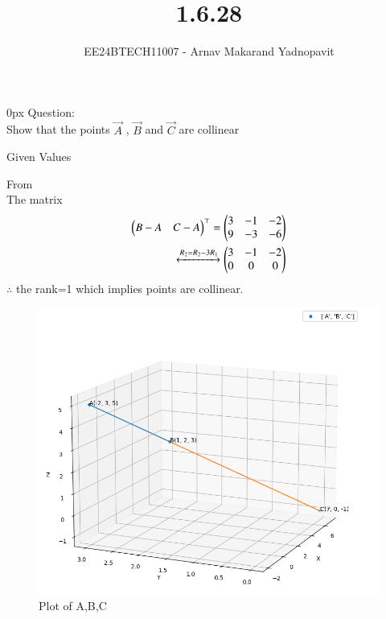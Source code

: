 \documentclass[journal]{IEEEtran}
\begin{document}

\title{1.6.28}
\author{EE24BTECH11007 - Arnav Makarand Yadnopavit}
{\let\newpage\relax\maketitle}
\renewcommand{\thefigure}{\theenumi}
\renewcommand{\thetable}{\theenumi}
\setlength{\intextsep}{10pt} %
\renewcommand{\thetable}{\theenumi}
\parindent 0px
Question:\\
Show that the points $\vec{A}$ , $\vec{B}$  and $\vec{C}$  are collinear\\
\solution
\begin{table}[h]
    \centering
    
    \caption{Given Values}
    \label{tab:1}
\end{table}
From \\
The matrix
\begin{align}
\begin{pmatrix}B-A & C-A\end{pmatrix}^\top=\begin{pmatrix}3 & -1 & -2 \\ 9 & -3 & -6\end{pmatrix}\\
\xleftrightarrow[]{R_2 =R_2 -3R_1} 
\begin{pmatrix}3 & -1 & -2 \\ 0 & 0 & 0\end{pmatrix}
\end{align}
$\therefore$ the rank=1 which implies points are collinear.
\begin{figure}[h]
    \centering
    \includegraphics[width=\columnwidth]{figs/fig.png}
    \caption{Plot of A,B,C}
 \end{figure}
\end{document}
